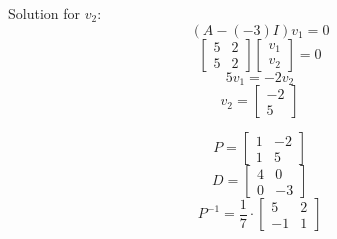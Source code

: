 \documentclass[12pt,a4paper, margin=1in]{article}
\begin{document}
\begin{enumerate}
\begin{enumerate}
            Solution for $v_2$:
            \begin{equation*}
                (A - (-3)I)v_1 = 0
            \end{equation*}
            \begin{equation*}
                \begin{bmatrix}
                    5 & 2 \\
                    5 & 2
                \end{bmatrix}\begin{bmatrix}
                    v_1 \\ v_2
                \end{bmatrix} = 0
            \end{equation*}
            \begin{equation*}
                5v_1 = -2v_2
            \end{equation*}
            \begin{equation*}
                v_2 = \begin{bmatrix}
                    -2 \\ 5
                \end{bmatrix}
            \end{equation*}
            
            \bigskip \bigskip
            
            \begin{equation*}
                P = \begin{bmatrix}
                    1 & -2 \\
                    1 & 5
                \end{bmatrix}
            \end{equation*}
            \begin{equation*}
                D = \begin{bmatrix}
                    4 & 0 \\
                    0 & -3
                \end{bmatrix}
            \end{equation*}
            \begin{equation*}
                P^{-1} = \frac{1}{7} \cdot \begin{bmatrix}
                    5 & 2 \\
                    -1 & 1
                \end{bmatrix}
            \end{equation*}
            

\end{enumerate}
\end{enumerate}
\end{document}
